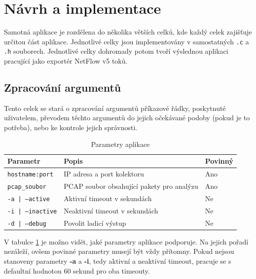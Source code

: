 \documentclass[11pt, a4paper, hidelinks]{article}[08.10.2023]
\begin{document}
    \section{Návrh a implementace}
    Samotná aplikace je rozdělena do několika větších celků, kde každý celek zajišťuje určitou část aplikace. Jednotlivé celky jsou implementovány v 
    samostatných \texttt{.c} a \texttt{.h} souborech. Jednotlivé celky dohromady potom tvoří výslednou aplikaci pracující jako exportér
    NetFlow v5 toků.

    \subsection{Zpracování argumentů}
    Tento celek se stará o zpracování argumentů příkazové řádky, poskytnuté uživatelem, převodem těchto argumentů
    do jejich očekávané podoby (pokud je to potřeba), nebo ke kontrole jejich správnosti.

    \begin{table}[H]
        \centering
        \begin{tabular}{|l|l|l|}
        \hline
        \textbf{Parametr}         & \textbf{Popis}                                                  & \textbf{Povinný}  \\ \hline
        \texttt{hostname:port}    & IP adresa a port kolektoru                                      & Ano              \\ \hline
        \texttt{pcap\_soubor}     & PCAP soubor obsahující pakety pro analýzu                       & Ano              \\ \hline
        \texttt{-a | --active}         & Aktivní timeout v sekundách                                     & Ne               \\ \hline
        \texttt{-i | --inactive}         & Neaktivní timeout v sekundách                                   & Ne               \\ \hline
        \texttt{-d | --debug}               & Povolit ladicí výstup                                           & Ne               \\ \hline
        \end{tabular}
        \caption{Parametry aplikace}
        \label{parametry}
    \end{table}
        
    V tabulce \ref{parametry} je možno vidět, jaké parametry aplikace podporuje. Na jejich pořadí nezáleží, ovšem povinné parametry
    musejí být vždy přítomny. Pokud nejsou stanoveny parametry \textbf{-a} a \textbf{-i}, tedy aktivní a neaktivní timeout, pracuje se s 
    defaultní hodnotou 60 sekund pro oba timeouty.
\end{document}

